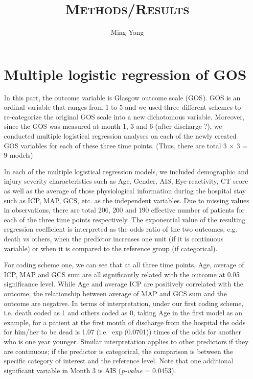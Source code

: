 \documentclass{article}
\begin{document}
\title{\textsc{Methods/Results}}
\author{Ming Yang}
\date{}
\maketitle

\tableofcontents
\newpage


\section{Multiple logistic regression of GOS} 
In this part, the outcome variable is Glasgow outcome scale (GOS). GOS is an ordinal variable that ranges from 1 to 5 and we used three different schemes to re-categorize the original GOS scale into a new dichotomous variable. Moreover, since the GOS was measured at month 1, 3 and 6 (after discharge ?), we conducted multiple logistical regression analyses on each of the newly created GOS variables for each of these three time points. (Thus, there are total 3 $\times$ 3 = 9 models)

In each of the multiple logistical regression models, we included demographic and injury severity characteristics such as Age, Gender, AIS, Eye-reactivity, CT score as well as the average of those physiological information during the hospital stay such as ICP, MAP, GCS, etc. as the independent variables. Due to missing values in observations, there are total 206, 200 and 190 effective number of patients for each of the three time points respectively. The exponential value of the resulting regression coefficient is interpreted as the odds ratio of the two outcomes, e.g. death vs others, when the predictor increases one unit (if it is continuous variable) or when it is compared to the reference group (if categorical).

For coding scheme one, we can see that at all three time points, Age, average of ICP, MAP and GCS sum are all significantly related with the outcome at 0.05 significance level. While Age and average ICP are positively correlated with the outcome, the relationship between average of MAP and GCS sum and the outcome are negative. In terms of interpretation, under our first coding scheme, i.e. death coded as 1 and others coded as 0, taking Age in the first model as an example, for a patient at the first month of discharge from the hospital the odds for him/her to be dead is 1.07 (i.e. $\exp$(0.0701)) times of the odds for another who is one year younger. Similar interpretation applies to other predictors if they are continuous; if the predictor is categorical, the comparison is between the specific category of interest and the reference level. Note that one additional significant variable in Month 3 is AIS (\emph{p-value} = 0.0453).
\end{document}
